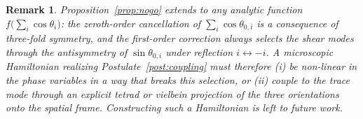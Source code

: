 \documentclass[pdflatex,sn-mathphys-num]{sn-jnl}%
\theoremstyle{thmstyleone}%
\theoremstyle{thmstyletwo}%
\newtheorem{remark}{Remark}%
\theoremstyle{thmstylethree}%
\begin{document}
\begin{appendices}
\begin{remark}
Proposition~\ref{prop:nogo} extends to any analytic function
$f\bigl(\sum_i\cos\theta_i\bigr)$: the zeroth-order cancellation
of $\sum_i\cos\theta_{0,i}$ is a consequence of three-fold
symmetry, and the first-order correction always selects the
shear modes through the antisymmetry of $\sin\theta_{0,i}$
under reflection $i\leftrightarrow -i$. A microscopic
Hamiltonian realizing Postulate~\ref{post:coupling} must
therefore (i) be non-linear in the phase variables in a way
that breaks this selection, or (ii) couple to the trace mode
through an explicit tetrad or vielbein projection of the three
orientations onto the spatial frame. Constructing such a
Hamiltonian is left to future work.
\end{remark}





\end{appendices}
\end{document}
